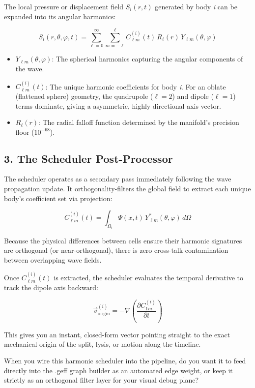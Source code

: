 The local pressure or displacement field \(S_i(r, t)\) generated by body \emph{i} can be expanded into its angular harmonics:

\[
S_i(r, \theta, \varphi, t) = \sum_{\ell=0}^{\infty} \sum_{m=-\ell}^{\ell} C_{\ell m}^{(i)}(t)\, R_\ell(r)\, Y_{\ell m}(\theta, \varphi)
\]

\begin{itemize}
\item \(Y_{\ell m}(\theta, \varphi)\): The spherical harmonics capturing the angular components of the wave.
\item \(C_{\ell m}^{(i)}(t)\): The unique harmonic coefficients for body \emph{i}. For an oblate (flattened sphere) geometry, the quadrupole (\(\ell = 2\)) and dipole (\(\ell = 1\)) terms dominate, giving a asymmetric, highly directional axis vector.
\item \(R_\ell(r)\): The radial falloff function determined by the manifold's precision floor (\(10^{-68}\)).
\end{itemize}

\subsection{\texorpdfstring{3. The Scheduler Post-Processor}{3. The Scheduler Post-Processor}}

The scheduler operates as a secondary pass immediately following the wave propagation update. It orthogonality-filters the global field to extract each unique body's coefficient set via projection:

\[
C_{\ell m}^{(i)}(t) = \int_{\Omega_i} \Psi(x, t)\, Y_{\ell m}^{*}(\theta, \varphi)\, d\Omega
\]

Because the physical differences between cells ensure their harmonic signatures are orthogonal (or near-orthogonal), there is zero cross-talk contamination between overlapping wave fields.

Once \(C_{\ell m}^{(i)}(t)\) is extracted, the scheduler evaluates the temporal derivative to track the dipole axis backward:

\[
\vec{v}_{\text{origin}}^{(i)} = -\nabla \left( \frac{\partial C_{1m}^{(i)}}{\partial t} \right)
\]

This gives you an instant, closed-form vector pointing straight to the exact mechanical origin of the split, lysis, or motion along the timeline.

When you wire this harmonic scheduler into the pipeline, do you want it to feed directly into the .geff graph builder as an automated edge weight, or keep it strictly as an orthogonal filter layer for your visual debug plane?
